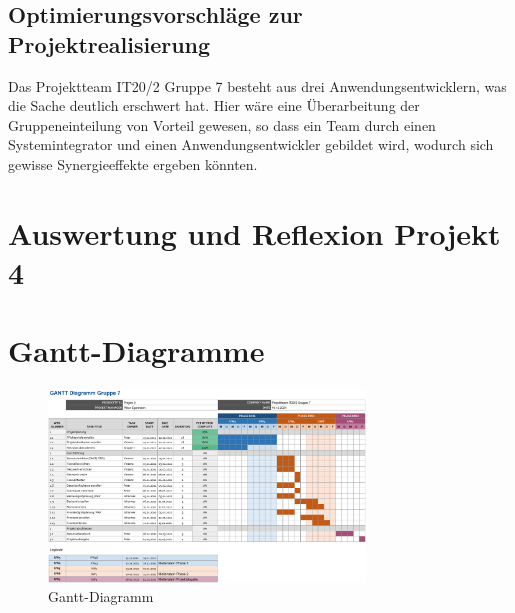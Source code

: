 \documentclass[a4paper,
    11pt,
    headings=small,
    ngerman,
    listof=totoc,
    numbers=noenddot]{scrreprt}[2021/11/13]
\begin{document}
\section{Optimierungsvorschläge zur Projektrealisierung}

Das Projektteam IT20/2 Gruppe 7 besteht aus drei Anwendungsentwicklern, was die Sache deutlich erschwert hat. Hier wäre eine Überarbeitung der Gruppeneinteilung von Vorteil gewesen, so dass ein Team durch einen Systemintegrator und einen Anwendungsentwickler gebildet wird, wodurch sich gewisse Synergieeffekte ergeben könnten.



\chapter{Auswertung und Reflexion Projekt 4}

\newpage

\listoffigures
\listoftables
\lstlistoflistings
\printbibliography[keyword=Quelle,title={Literaturverzeichnis},heading=bibintoc]

\newpage

\appendix
{}



\chapter{Gantt-Diagramme}

\begin{figure}[h!]
  \centering
  \includegraphics[angle=90,origin=c,width=0.75\textwidth]{data/Gantt.png}
  \caption{Gantt-Diagramm}
  \label{fig:Gantt}
\end{figure}

\newpage
\end{document}
